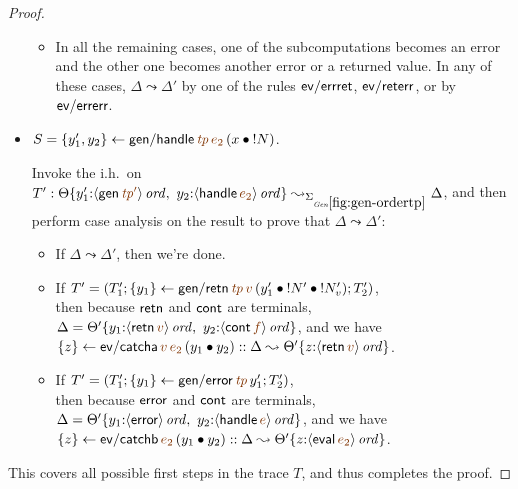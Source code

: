 \begin{proof}
\begin{itemize}
\begin{itemize}
\item In all the remaining cases, one of the subcomputations becomes
  an error and the other one becomes another error or a returned
  value.  In any of these cases, $\Delta \leadsto \Delta'$ by one of
  the rules ${\sf ev/errret}$, ${\sf ev/reterr}$, or by ${\sf
    ev/errerr}$.

\end{itemize}

\medskip
\item $S = \trstep{y_1', y_2}{{\sf gen/handle}\,\lf{{\it tp}}\,\lf{e_2}\,(\tfuser{x}{\tbangr{N}})}$.

Invoke the i.h.~on  
$T' :  \tackon{\Theta}{y_1'{:}\istrue{\susp{{\sf gen}\,\lf{{\it tp}'}}}, ~ 
                        y_2{:}\istrue{\susp{{\sf handle}\,\lf{e_2}}}}
\leadsto_{\siggenordertp} \Delta$, and then perform case analysis on the result
to prove that $\Delta \leadsto \Delta'$:

\begin{itemize}
\item If $\Delta \leadsto \Delta'$, then we're done. 
\item If $T' = \left(T_1'; \trstep{y_1}{{\sf gen/retn}\,\lf{{\it tp}}\,\lf{v}\,(\tfuser{y_1'}{\tfuser{\tbangr{N'}}{\tbangr{N_v'}}})}; T_2'\right)$,
\\
then because ${\sf retn}$ and ${\sf cont}$ are 
terminals, $\Delta = \tackon{\Theta'}{
         y_1{:}\istrue{\susp{{\sf retn}\,\lf{v}}}, ~
         y_2{:}\istrue{\susp{{\sf cont}\,\lf{f}}}}$, and 
we have $\trstep{z}{{\sf ev/catcha}\,\lf{v}\,\lf{e_2}\,(\tfuser{y_1}{y_2})}
:: \Delta \leadsto \tackon{\Theta'}{z{:}\istrue{\susp{{\sf retn}\,\lf{v}}}}$.

\item If $T' = \left(T_1'; \trstep{y_1}{{\sf gen/error}\,\lf{{\it tp}}\,y_1'}; T_2'\right)$,
\\
then because ${\sf error}$ and ${\sf cont}$ are terminals,
$\Delta = \tackon{\Theta'}{
         y_1{:}\istrue{\susp{{\sf error}}}, ~
         y_2{:}\istrue{\susp{{\sf handle}\,\lf{e}}}}$, and we have
$\trstep{z}{{\sf ev/catchb}\,\lf{e_2}\,(\tfuser{y_1}{y_2})} :: \Delta \leadsto \tackon{\Theta'}{z{:}\istrue{\susp{{\sf eval}\,\lf{e_2}}}}$.

\end{itemize}

\end{itemize}

\noindent
This covers all possible first steps in the trace $T$, and thus completes
the proof.
\end{proof}

